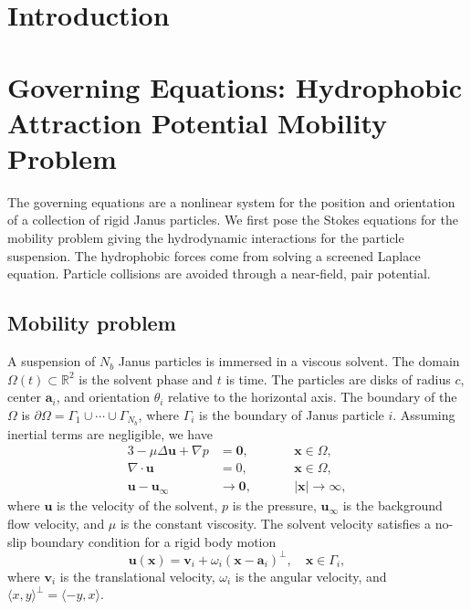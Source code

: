 \documentclass[aps,prl,preprint,groupedaddress]{revtex4-2}
\renewcommand{\aa}{\mathbf{a}}
\newcommand{\bd}{\partial}
\newcommand{\xx}{\mathbf{x}}
\newcommand{\uu}{\mathbf{u}}
\renewcommand{\vv}{\mathbf{v}}
\begin{document}
\section{Introduction}


\section{Governing Equations: Hydrophobic Attraction Potential Mobility Problem} 
The governing equations are a nonlinear system
for the position and orientation of a collection of
rigid Janus particles.
We first pose the Stokes equations
for the mobility problem giving the hydrodynamic interactions
for the particle suspension.  
The hydrophobic forces come from solving a screened Laplace equation.
Particle collisions are avoided through a near-field, pair
potential.

\subsection{Mobility problem}
A suspension of $N_b$ Janus particles is immersed in a viscous solvent.
The domain $\Omega(t) \subset \mathbb{R}^2$ is the solvent phase
and $t$ is time.
The particles are disks of radius $c$, center $\aa_i$, and
orientation $\theta_i$ relative to the horizontal axis.  
The boundary of the $\Omega$ is $\bd\Omega = \Gamma_1 \cup
\cdots \cup \Gamma_{N_b}$, where $\Gamma_i$ is the boundary of Janus
particle $i$. Assuming inertial terms are
negligible, we have 
\begin{alignat}{3}
\label{eq:stokes}
  -\mu \Delta \uu + \nabla p &= \mathbf{0},     && \xx \in \Omega, \\
  \nabla\cdot \uu &= 0, \qquad && \xx \in \Omega, \\
  \uu - \uu_\infty &\to \mathbf{0}, && |\xx| \to \infty,
\end{alignat}
where $\uu$ is the velocity of the solvent,
$p$ is the pressure, $\uu_\infty$ is the
background flow velocity, and $\mu$ is the constant viscosity.
The solvent velocity satisfies a no-slip boundary
condition for a rigid body motion
\begin{equation}
  \label{eq:rigid-vel}
  \uu(\xx) = \vv_i + \omega_i (\xx - \aa_i)^\perp, 
    \quad \xx \in \Gamma_i,
\end{equation}
where $\vv_i$ is the translational velocity, $\omega_i$ is the
angular velocity, and
$\langle x, y \rangle^{\perp} = \langle -y, x\rangle$.
\end{document}
